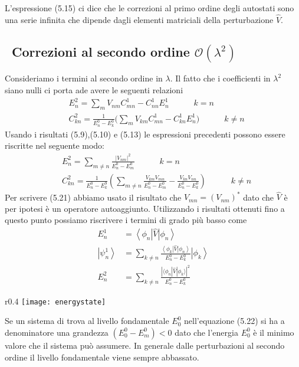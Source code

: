  L'espressione (5.15) ci dice che le correzioni al primo ordine degli autostati sono una serie infinita che dipende dagli elementi matriciali della perturbazione $\hat{V}$.
 
\subsection{ Correzioni al secondo ordine $\mathcal{O}(\lambda^2)$}

Consideriamo i termini al secondo ordine in $\lambda$. Il fatto che i coefficienti in $\lambda^2$ siano nulli ci porta ade avere le seguenti relazioni
\begin{align}
	& E_n^2 = \sum_{m} V_{nm}C_{mn}^1 - C^1_{nn}E_n^1  \quad \quad \quad k = n\\[0.3cm]
	& C^2_{kn} = \frac{1}{E_n^0-E_k^0} \Big( \sum_{m} V_{km}C_{mn}^1 - C_{kn}^1E_n^1 \Big  ) 
	\quad \quad \quad  k \neq n
\end{align}  
Usando i risultati (5.9),(5.10) e (5.13) le espressioni precedenti possono essere riscritte nel seguente modo:
\newpage 
\begin{align}
	& E_n^2 = \sum_{m \neq n} \frac{|V_{nm}|^2}{E_n^0-E_m^0} \quad \quad \quad k = n \\[0.3cm]
	& C^2_{kn} = \frac{1}{E_n^0 - E_k^9} \left( \sum_{m \neq n} \frac{V_{km}V_{mn}}{E_n^0-E_m^0} - \frac{V_{kn}V_{nn}}{E_n^0-E_k^0} \right) \quad \quad \quad k \neq n
\end{align}
Per scrivere (5.21) abbiamo usato il risultato che $V_{mn} = (V_{nm})^*$ dato che $\hat{V}$ \`e per ipotesi \`e un operatore autoaggiunto.
Utilizzando i risultati ottenuti fino a questo punto possiamo riscrivere i termini di grado pi\`u basso come 
\begin{align}
E_n^1 & =\left\langle\phi_n\right| \hat{V}\left|\phi_n\right\rangle \\[0.3cm]
\left|\psi_n^1\right\rangle & =\sum_{k \neq n} \frac{\left\langle\phi_k\right| \hat{V}\left|\phi_n\right\rangle}{E_n^0-E_k^0}\left|\phi_k\right\rangle \\[0.3cm]
E_n^2 & =\sum_{k \neq n} \frac{\left|\langle\phi_n | \hat{V}| \phi_k\rangle \right|^ 2}{E_n^0-E_k^0}
\end{align}

\begin{wrapfigure}{r}{0.4\textwidth} %
    \centering
    \texttt{[image: energystate]} %
    \label{fig:example}
\end{wrapfigure}
Se un sistema di trova al livello fondamentale $E_0^0$ nell'equazione (5.22) si ha a denominatore una grandezza $(E_0^0-E_m^0) < 0$ dato che  l'energia $E_0^0$ \`e il minimo valore che il sistema pu\`o assumere. 
In generale dalle perturbazioni al secondo ordine il livello fondamentale viene sempre abbassato.

